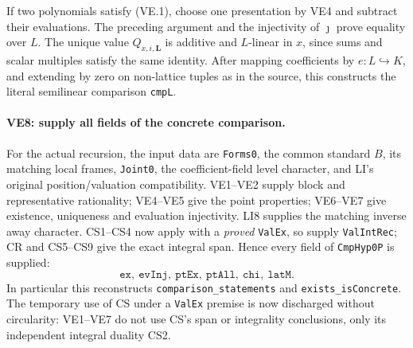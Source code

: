 \documentclass[11pt,a4paper]{article}
\numberwithin{equation}{section}
\theoremstyle{remark}\newtheorem{remark}[theorem]{Remark}
\begin{document}
If two polynomials satisfy (VE.1), choose one presentation by VE4
and subtract their evaluations. The preceding argument and the
injectivity of $\jmath$ prove equality over $L$. The unique value
$Q_{x,i,\mathbf L}$ is additive and $L$-linear in $x$, since sums
and scalar multiples satisfy the same identity. After mapping
coefficients by $e:L\hookrightarrow K$, and extending by zero on
non-lattice tuples as in the source, this constructs the literal
semilinear comparison \texttt{cmpL}.

\paragraph{VE8: supply all fields of the concrete comparison.}
For the actual recursion, the input data are
\texttt{Forms0}, the common standard $B$, its matching local frames,
\texttt{Joint0}, the coefficient-field level character, and LI's
original position/valuation compatibility. VE1--VE2 supply block
and representative rationality; VE4--VE5 give the point properties;
VE6--VE7 give existence, uniqueness and evaluation injectivity.
LI8 supplies the matching inverse away character. CS1--CS4 now apply
with a \emph{proved} \texttt{ValEx}, so supply \texttt{ValIntRec};
CR and CS5--CS9 give the exact integral span. Hence every field of
\texttt{CmpHyp0P} is supplied:
\[
 \texttt{ex},\ \texttt{evInj},\ \texttt{ptEx},\
 \texttt{ptAll},\ \texttt{chi},\ \texttt{latM}.
                                                        \tag{VE.12}
\]
In particular this reconstructs \texttt{comparison\_\allowbreak statements}
and \texttt{exists\_\allowbreak isConcrete}. The temporary use of CS under a
\texttt{ValEx} premise is now discharged without circularity: VE1--VE7
do not use CS's span or integrality conclusions, only its independent
integral duality CS2.
\end{document}
